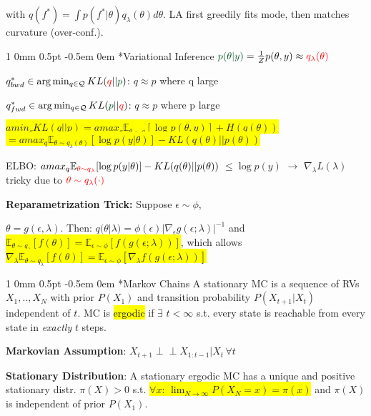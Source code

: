 \documentclass[11pt,landscape,a4paper,fleqn]{article}
\makeatletter
\newcommand*{\rsection}{%
	\@startsection{section}%
	{1}%
	{0mm}%
	{0.5pt}%
	{-0.5em \@plus 0em}
	{\color{myorange}\sffamily\small\bfseries}}
\newcommand{\mhl}[1]{\setlength{\fboxsep}{0pt}\colorbox{yellow}{#1}}
\newcommand{\indep}{\perp\!\!\!\perp}
\makeatother
\begin{document}
\begin{multicols*}{4}
\vspace*{-1mm}
with $q(f^*) = \int p(f^* | \theta) q_\lambda(\theta) d\theta$.  LA first greedily fits mode, then matches curvature (over-conf.).

\rsection*{Variational Inference} {\fontsize{9.5}{6}\selectfont $\textcolor{darkgreen}{p(\theta | y)} = \frac{1}{Z} p(\theta, y) \approx \textcolor{red}{q_\lambda(\theta)}$}

$q_{bwd}^* \in \arg\min_{q \in \mathcal{Q}} KL(\textcolor{red}{q} || \textcolor{darkgreen}{p})$: $q \approx p$ where q large

$q_{fwd}^* \in \arg\min_{q \in \mathcal{Q}} KL(\textcolor{darkgreen}{p} || \textcolor{red}{q})$: $q \approx p$ where p large

\mhl{$amin_q KL(q||p) = amax_q \mathbb{E}_{\theta \sim q}[\log p(\theta, y)] + H(q(\theta))$}
\mhl{$ = 	amax_q \mathbb{E}_{\theta \sim q_\lambda(\theta)}[\log p(y | \theta)] - KL(q(\theta)||p(\theta))$}

ELBO: $amax_{q} \mathbb{E}_{\textcolor{red}{\theta \sim q_\lambda}} [\log p(y | \theta)] - KL(q(\theta)||p(\theta))$ $ \leq \log p(y)$ $\rightarrow$ $\nabla_\lambda L(\lambda)$ tricky due to $\textcolor{red}{\theta \sim q_\lambda(\cdot)}$

\textbf{Reparametrization Trick:} Suppose $\epsilon \sim \phi$, 

\vspace*{-1mm}
$\theta = g(\epsilon, \lambda)$. Then: $q(\theta | \lambda) = \phi(\epsilon) |\nabla_\epsilon g(\epsilon; \lambda)|^{-1}$ and \mhl{$\mathbb{E}_{\theta \sim q_\lambda}[f(\theta)] = \mathbb{E}_{\epsilon \sim \phi}[f(g(\epsilon; \lambda))]$}, which allows \mhl{$\nabla_\lambda \mathbb{E}_{\theta \sim q_\lambda}[f(\theta)] = \mathbb{E}_{\epsilon \sim \phi}[\nabla_\lambda f(g(\epsilon; \lambda))]$}

\rsection*{Markov Chains} A stationary MC is a sequence of RVs $X_1,..,X_N$ with prior $P(X_1)$ and transition probability $P(X_{t+1} | X_t)$ independent of $t$. MC is \hl{ergodic} if $\exists$ $t < \infty$ s.t. every state is reachable from every state in \textit{exactly} $t$ steps.

\textbf{Markovian Assumption}: $X_{t+1} \indep X_{1:t-1} | X_t \, \forall t$

\textbf{Stationary Distribution}: A stationary ergodic MC has a unique and positive stationary distr. $\pi(X) > 0$ s.t. \mhl{$\forall x$: $\lim_{N \rightarrow \infty} P(X_N = x) = \pi(x)$} and $\pi(X)$ is independent of prior $P(X_1)$.


\end{multicols*}
\end{document}

